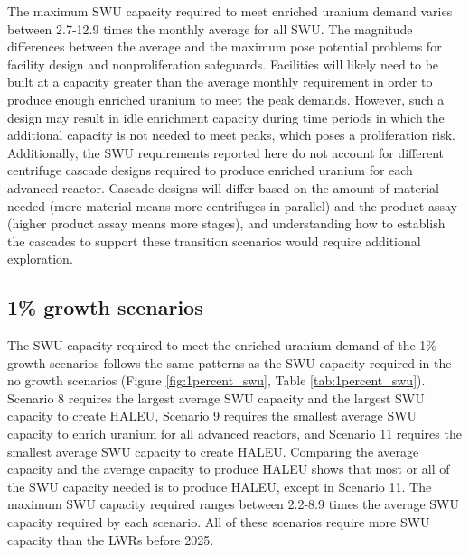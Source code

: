 The maximum \gls{SWU} capacity required to meet enriched uranium demand 
varies between 2.7-12.9 times the monthly average for all \gls{SWU}. 
The magnitude differences between the average and the maximum pose potential 
problems for facility design and nonproliferation safeguards. Facilities 
will likely need to be built at a capacity greater than the average 
monthly requirement in order to produce enough enriched uranium to meet 
the peak demands. However, such a design may result in idle enrichment 
capacity during time periods in which the additional capacity is 
not needed to meet peaks, which poses a proliferation risk. Additionally, 
the \gls{SWU} requirements reported here do not account for different 
centrifuge cascade designs required to produce enriched uranium for 
each advanced reactor. Cascade designs will differ based on 
the amount of material needed (more material means more centrifuges in 
parallel) and the product assay (higher product assay means more stages), 
and understanding how to establish the cascades to support these transition 
scenarios would require additional exploration. 

\subsection{1\% growth scenarios}
The \gls{SWU} capacity required to meet the enriched uranium demand of 
the 1\% growth scenarios 
follows the same patterns as the \gls{SWU} capacity required in the no 
growth scenarios (Figure \ref{fig:1percent_swu}, Table \ref{tab:1percent_swu}).
Scenario 8 requires the largest average \gls{SWU} 
capacity and the largest \gls{SWU} capacity to create \gls{HALEU}, Scenario 
9 requires the smallest average \gls{SWU} capacity to enrich uranium 
for all advanced reactors, and 
Scenario 11 requires the smallest average \gls{SWU} capacity 
to create \gls{HALEU}. Comparing 
the average capacity and the average capacity to produce \gls{HALEU} 
shows that most or all of the \gls{SWU} capacity needed is to produce 
\gls{HALEU}, except in Scenario 11. The 
maximum \gls{SWU} capacity required ranges between 2.2-8.9 times 
the average \gls{SWU} capacity required by each scenario. All of these 
scenarios require more \gls{SWU} capacity than the \glspl{LWR} before 
2025. 

